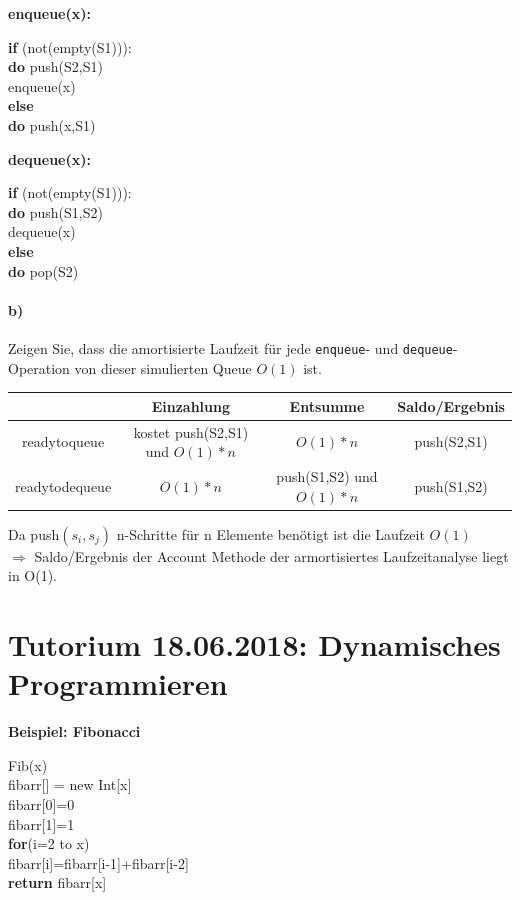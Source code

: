 \documentclass[paper=a4, fontsize=11pt]{scrartcl}
\numberwithin{equation}{section}
\numberwithin{figure}{section}
\numberwithin{table}{section}
\begin{document}
\textbf{enqueue(x):} \\
\begin{algorithm}[H]
\SetAlgoLined
\textbf{if} (not(empty(S1))): \\
\textbf{do} push(S2,S1) \\
enqueue(x)\\
\textbf{else} \\
\textbf{do} push(x,S1)
\end{algorithm}

\textbf{dequeue(x):} \\
\begin{algorithm}[H]
\SetAlgoLined
\textbf{if} (not(empty(S1))): \\
\textbf{do} push(S1,S2) \\
dequeue(x) \\
\textbf{else} \\
\textbf{do} pop(S2)
\end{algorithm}


\paragraph{b)} 
Zeigen Sie, dass die amortisierte Laufzeit für jede \texttt{enqueue}- und
\texttt{dequeue}-Operation von dieser simulierten Queue $O(1)$ ist. \\

\begin{tabular}{c|c|c|c}
& Einzahlung & Entsumme & Saldo/Ergebnis \\\hline
readytoqueue & kostet push(S2,S1) und $O(1)*n$ & $O(1)*n$ & push(S2,S1) \\\hline
readytodequeue & $O(1)*n$ & push(S1,S2) und $O(1)*n$ & push(S1,S2)
\end{tabular}

Da push$(s_{i},s_{j})$ n-Schritte für n Elemente benötigt ist die Laufzeit $O(1)$ \\
$\Rightarrow$ Saldo/Ergebnis der Account Methode der armortisiertes Laufzeitanalyse liegt in O(1).

\newpage
\section{Tutorium 18.06.2018: Dynamisches Programmieren}

\textbf{Beispiel: Fibonacci}

\begin{algorithm}[H]
\SetAlgoLined
Fib(x) \\
fibarr[] = new Int[x] \\
fibarr[0]=0 \\
fibarr[1]=1 \\
\textbf{for}(i=2 to x) \\
      fibarr[i]=fibarr[i-1]+fibarr[i-2] \\
\textbf{return} fibarr[x]      
\end{algorithm}

\end{document}
